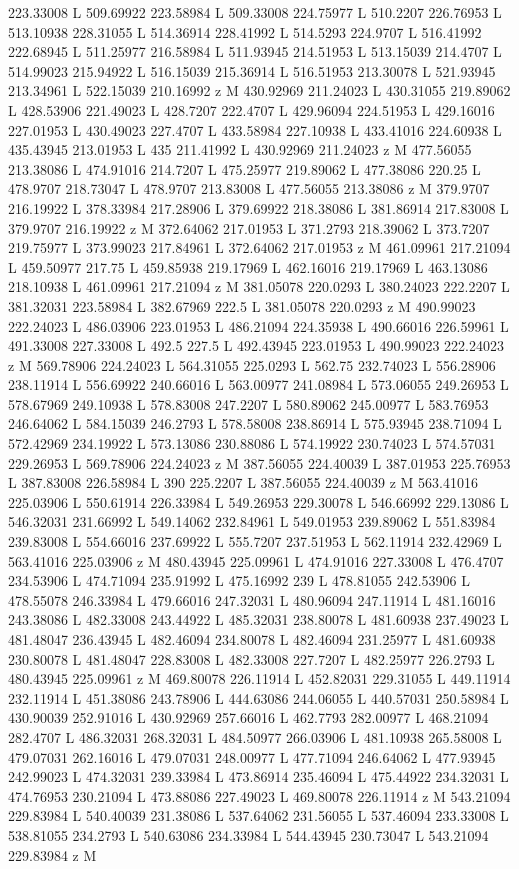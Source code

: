 {\begin{scope}[local bounding box=bb]
{223.33008 L 509.69922 223.58984 L 509.33008 224.75977 L 510.2207 226.76953 L 513.10938 228.31055 L 514.36914 228.41992 L 514.5293 224.9707 L 516.41992 222.68945 L 511.25977 216.58984 L 511.93945 214.51953 L 513.15039 214.4707 L 514.99023 215.94922 L 516.15039 215.36914 L 516.51953 213.30078 L 521.93945 213.34961 L 522.15039 210.16992 z M 430.92969 211.24023 L 430.31055 219.89062 L 428.53906 221.49023 L 428.7207 222.4707 L 429.96094 224.51953 L 429.16016 227.01953 L 430.49023 227.4707 L 433.58984 227.10938 L 433.41016 224.60938 L 435.43945 213.01953 L 435 211.41992 L 430.92969 211.24023 z M 477.56055 213.38086 L 474.91016 214.7207 L 475.25977 219.89062 L 477.38086 220.25 L 478.9707 218.73047 L 478.9707 213.83008 L 477.56055 213.38086 z M 379.9707 216.19922 L 378.33984 217.28906 L 379.69922 218.38086 L 381.86914 217.83008 L 379.9707 216.19922 z M 372.64062 217.01953 L 371.2793 218.39062 L 373.7207 219.75977 L 373.99023 217.84961 L 372.64062 217.01953 z M 461.09961 217.21094 L 459.50977 217.75 L 459.85938 219.17969 L 462.16016 219.17969 L 463.13086 218.10938 L 461.09961 217.21094 z M 381.05078 220.0293 L 380.24023 222.2207 L 381.32031 223.58984 L 382.67969 222.5 L 381.05078 220.0293 z M 490.99023 222.24023 L 486.03906 223.01953 L 486.21094 224.35938 L 490.66016 226.59961 L 491.33008 227.33008 L 492.5 227.5 L 492.43945 223.01953 L 490.99023 222.24023 z M 569.78906 224.24023 L 564.31055 225.0293 L 562.75 232.74023 L 556.28906 238.11914 L 556.69922 240.66016 L 563.00977 241.08984 L 573.06055 249.26953 L 578.67969 249.10938 L 578.83008 247.2207 L 580.89062 245.00977 L 583.76953 246.64062 L 584.15039 246.2793 L 578.58008 238.86914 L 575.93945 238.71094 L 572.42969 234.19922 L 573.13086 230.88086 L 574.19922 230.74023 L 574.57031 229.26953 L 569.78906 224.24023 z M 387.56055 224.40039 L 387.01953 225.76953 L 387.83008 226.58984 L 390 225.2207 L 387.56055 224.40039 z M 563.41016 225.03906 L 550.61914 226.33984 L 549.26953 229.30078 L 546.66992 229.13086 L 546.32031 231.66992 L 549.14062 232.84961 L 549.01953 239.89062 L 551.83984 239.83008 L 554.66016 237.69922 L 555.7207 237.51953 L 562.11914 232.42969 L 563.41016 225.03906 z M 480.43945 225.09961 L 474.91016 227.33008 L 476.4707 234.53906 L 474.71094 235.91992 L 475.16992 239 L 478.81055 242.53906 L 478.55078 246.33984 L 479.66016 247.32031 L 480.96094 247.11914 L 481.16016 243.38086 L 482.33008 243.44922 L 485.32031 238.80078 L 481.60938 237.49023 L 481.48047 236.43945 L 482.46094 234.80078 L 482.46094 231.25977 L 481.60938 230.80078 L 481.48047 228.83008 L 482.33008 227.7207 L 482.25977 226.2793 L 480.43945 225.09961 z M 469.80078 226.11914 L 452.82031 229.31055 L 449.11914 232.11914 L 451.38086 243.78906 L 444.63086 244.06055 L 440.57031 250.58984 L 430.90039 252.91016 L 430.92969 257.66016 L 462.7793 282.00977 L 468.21094 282.4707 L 486.32031 268.32031 L 484.50977 266.03906 L 481.10938 265.58008 L 479.07031 262.16016 L 479.07031 248.00977 L 477.71094 246.64062 L 477.93945 242.99023 L 474.32031 239.33984 L 473.86914 235.46094 L 475.44922 234.32031 L 474.76953 230.21094 L 473.88086 227.49023 L 469.80078 226.11914 z M 543.21094 229.83984 L 540.40039 231.38086 L 537.64062 231.56055 L 537.46094 233.33008 L 538.81055 234.2793 L 540.63086 234.33984 L 544.43945 230.73047 L 543.21094 229.83984 z M }
\end{scope}}
